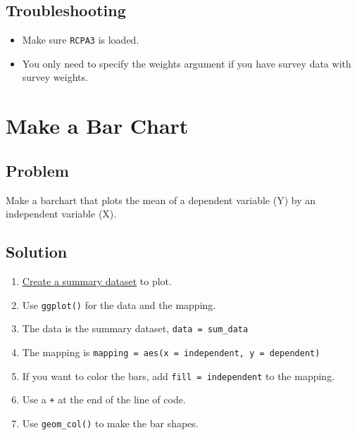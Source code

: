 \documentclass[
]{book}
\providecommand{\tightlist}{%
  \setlength{\itemsep}{0pt}\setlength{\parskip}{0pt}}
\begin{document}
\hypertarget{troubleshooting-27}{%
\subsection{Troubleshooting}\label{troubleshooting-27}}

\begin{itemize}
\tightlist
\item
  Make sure \texttt{RCPA3} is loaded.
\item
  You only need to specify the weights argument if you have survey data with survey weights.
\end{itemize}

\hypertarget{barchart}{%
\section{Make a Bar Chart}\label{barchart}}

\hypertarget{problem-31}{%
\subsection{Problem}\label{problem-31}}

Make a barchart that plots the mean of a dependent variable (Y) by an independent variable (X).

\hypertarget{solution-30}{%
\subsection{Solution}\label{solution-30}}

\begin{enumerate}
\def\labelenumi{\arabic{enumi}.}
\tightlist
\item
  \protect\hyperlink{sum}{Create a summary dataset} to plot.
\item
  Use \texttt{ggplot()} for the data and the mapping.
\item
  The data is the summary dataset, \texttt{data\ =\ sum\_data}
\item
  The mapping is \texttt{mapping\ =\ aes(x\ =\ independent,\ y\ =\ dependent)}
\item
  If you want to color the bars, add \texttt{fill\ =\ independent} to the mapping.
\item
  Use a \texttt{+} at the end of the line of code.
\item
  Use \texttt{geom\_col()} to make the bar shapes.
\end{enumerate}
\end{document}
